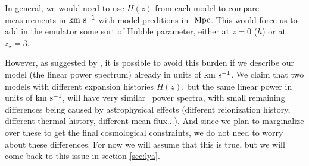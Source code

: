 In general, we would need to use $H(z)$ from each model to compare 
measurements in ${\rm km~s^{-1}}$ with model preditions in $\ \text{Mpc}$. 
This would force us to add in the emulator some sort of Hubble 
parameter, either at $z=0$ ($h$) or at $z_\star=3$. 

However, as suggested by \cite{McDonald2005a}, it is possible to avoid this
burden if we describe our model (the linear power spectrum) already in 
units of ${\rm km~s^{-1}}$.
We claim that two models with different expansion histories $H(z)$, but the
same linear power in units of ${\rm km~s^{-1}}$, will have very similar \lya\ power
spectra, with small remaining differences being caused by astrophysical 
effects (different reionization history, different thermal history, different
mean flux...). 
And since we plan to marginalize over these to get the final cosmological 
constraints, we do not need to worry about these differences. 
For now we will assume that this is true, but we will come back to this 
issue in section \ref{sec:lya}.


